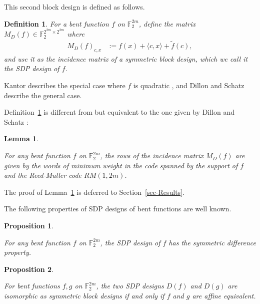 \documentclass[12pt,a4paper]{article}
\newcommand{\mb}[1]{\mathbb{#1}}
\newcommand{\F}{\mb{F}}
\newcommand{\dual}[1]{\widetilde{#1}}
\newtheorem{Lemma}{Lemma}
\newtheorem{Proposition}{Proposition}
\newtheorem{Definition}{Definition}
\begin{document}
This second block design is defined as follows.
\begin{Definition}
\label{def-SDP-design}
For a bent function  $f$ on $\F_2^{2m}$, define the matrix $M_D(f) \in \F_2^{2^{2m} \times 2^{2m}}$ where
\begin{align}
M_D(f)_{c,x} &:= f(x) + \langle c, x \rangle + \dual{f}(c),
\label{D-f-def}
\end{align}
and use it as the incidence matrix of a symmetric block design, which
we call it the \emph{SDP design} of $f$.
\end{Definition}

Kantor describes the special case where $f$ is quadratic
\cite[Section 5]{Kan75symplectic},
and Dillon and Schatz \cite{DilS87block} describe the general case.

Definition~\ref{def-SDP-design} is different from but equivalent to the one given by Dillon and Schatz \cite[p. 160]{DilS87block}:
\begin{Lemma}
\label{lm-SDP-design-rows}
\cite[3.29]{Neu06bent}

For any bent function $f$ on $\F_2^{2m}$, the rows of the incidence matrix $M_D(f)$
are given by the words of minimum weight in the code spanned by the support of $f$ and the Reed-Muller code $RM(1,2m)$.
\end{Lemma}
The proof of Lemma~\ref{lm-SDP-design-rows} is deferred to Section~\ref{sec-Results}.

The following properties of SDP designs of bent functions are well known.
\begin{Proposition}
\label{prop-SDP-design}
\cite[p. 160]{DilS87block} \cite[Theorem 3.29]{Neu06bent}

For any bent function $f$ on $\F_2^{2m}$, the SDP design of $f$ has the symmetric difference property.
\end{Proposition}

\begin{Proposition}
\label{prop-SDP-design-affine-equivalence}
\cite[p. 161]{DilS87block} \cite{Kan83exponential}

For bent functions $f, g$ on $\F_2^{2m}$,
the two SDP designs $D(f)$ and $D(g)$ are isomorphic as symmetric block designs if and only if $f$ and $g$ are affine equivalent.
\end{Proposition}

%
%

\end{document}
